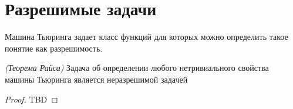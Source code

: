 \section{Разрешимые задачи}

Машина Тьюринга задает класс функций для которых можно определить
такое понятие как разрешимость.

\begin{theorem}
\emph{(Теорема Райса)}
Задача об определении любого нетривиального свойства машины Тьюринга
является неразрешимой задачей
\end{theorem}

\begin{proof}
TBD
\end{proof}

